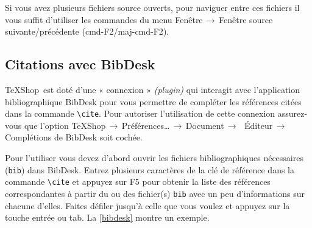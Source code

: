 \documentclass[11pt,french]{article}
\newcommand{\TS}{\textsf{\TeX Shop}}
\newcommand{\cmd}[1]{\textsf{#1}}
\newcommand{\mnu}[1]{\textsf{#1}}
\newcommand{\To}{\,\(\to\)\,}
\begin{document}
Si vous avez plusieurs fichiers source ouverts, pour naviguer entre ces fichiers il vous suffit d'utiliser les commandes du menu \mnu{Fenêtre}\To\mnu{Fenêtre source suivante/précédente} (\cmd{cmd-F2}/\cmd{maj-cmd-F2}).


\subsection{Citations avec \cmd{BibDesk}}

\TS\ est doté d'une « connexion » \emph{(plugin)} qui interagit avec l'application bibliographique \cmd{BibDesk} pour vous permettre de compléter les références citées dans la commande \verb|\cite|. Pour autoriser l'utilisation de cette connexion assurez-vous que l'option \mnu{TeXShop}\To\mnu{Préférences…}\To\mnu{Document}\To\ \mnu{Éditeur}\To\mnu{Complétions de BibDesk} soit cochée.

Pour l'utiliser vous devez d'abord ouvrir les fichiers bibliographiques nécessaires (\texttt{bib}) dans \cmd{BibDesk}. Entrez plusieurs caractères de la clé de référence dans la commande \verb|\cite| et appuyez sur \cmd{F5} pour obtenir la liste des références correspondantes à partir du ou des fichier(s) \texttt{bib} avec un peu d'informations sur chacune d'elles. Faites défiler jusqu'à celle que vous voulez et appuyez sur la touche \cmd{entrée} ou \cmd{tab}. La \vref{bibdesk} montre un exemple.
\end{document}
